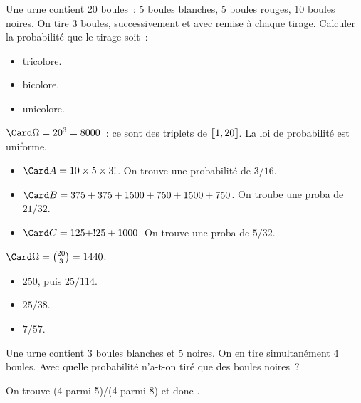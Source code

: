 \documentclass{magnolia}
\begin{document}
\begin{exos}
  \exo Une urne contient 20 boules~: 5 boules blanches, 5 boules rouges, 10 boules noires.
  On tire 3 boules, successivement et avec remise à chaque tirage. Calculer la probabilité que
    le tirage soit~:
    \begin{itemize}
  \item tricolore.
  \item bicolore.
  \item unicolore.
    \end{itemize}
  \begin{sol}
  \begin{questions}
  \question $\Card\Omega=20^3=8000$~: ce sont des triplets de $\left\llbracket 1,20\right\rrbracket$. La loi de probabilité est uniforme.
    \begin{itemize}
    \item $\Card A=10\times 5\time 5\times 3!$. On trouve une probabilité de $3/16$.
    \item $\Card B=375+375+1500+750+1500+750$. On troube une proba de $21/32$.
    \item $\Card C=125+!25+1000$. On trouve une proba de $5/32$.
    \end{itemize}
  \question $\Card\Omega=\binom{20}{3}=1440$.
    \begin{itemize}
    \item $250$, puis $25/114$.
    \item $25/38$.
    \item $7/57$.
    \end{itemize}
  \end{questions}
  \end{sol}
  \exo Une urne contient 3 boules blanches et 5 noires. On en tire simultanément 4 boules.
    Avec quelle probabilité n'a-t-on tiré que des boules noires~?
    \begin{sol}
    On trouve (4 parmi 5)/(4 parmi 8) et donc .
    \end{sol}
\end{exos}
\end{document}
